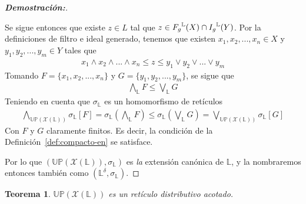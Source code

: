 \documentclass[12pt]{book}
\newtheorem{theorem}{Teorema}[section]
\newcommand{\Fg}{\mathnormal{F_g}}
\newcommand{\Ig}{\mathnormal{I_g}}
\newcommand{\Up}{\mathbb{UP}}
\begin{document}
\begin{proof}[\textbf{Demostración:}]
\begin{enumerate}
Se sigue entonces que existe  $z\in L$ tal que $z\in \Fg^{\mathbb{L}}(X)\cap \Ig^{\mathbb{L}}(Y)$. Por la definiciones de filtro e ideal generado, tenemos que existen $x_1,x_2,...,x_n\in X$ y $y_1,y_2,...,y_m\in Y$ tales que
\begin{align*}
    x_1\wedge x_2\wedge...\wedge x_n\leq z\leq y_1\vee y_2\vee...\vee y_m
\end{align*}
Tomando $F=\{x_1,x_2,...,x_n\}$ y $G=\{y_1,y_2,...,y_m\}$, se sigue que
\begin{align*}
    \bigwedge_\mathbb L{} F\leq \bigvee_{\mathbb L} G
\end{align*}
Teniendo en cuenta que $\sigma_{\mathbb{L}}$ es un homomorfismo de retículos
\begin{align*}
    \bigwedge_{\Up(\mathcal{X}(\mathbb L))} \sigma_{\mathbb{L}}[F]=\sigma_{\mathbb{L}}\left(\bigwedge_{\mathbb{L}} F\right)\leq \sigma_{\mathbb{L}}\left(\bigvee_{\mathbb{L}} G\right) =\bigvee_{\Up(\mathcal{X}(\mathbb L))} \sigma_{\mathbb{L}}[G]
\end{align*}
Con $F$ y $G$ claramente finitos. Es decir, la condición de la Definición~\ref{def:compacto-en} se satisface.
\end{enumerate}
Por lo que $\left(\Up(\mathcal{X}(\mathbb{L})),\sigma_{\mathbb{L}} \right)$ es \emph{la} extensión canónica de $\mathbb{L}$, y la nombraremos entonces también como $(\mathbb{L}^\delta, \sigma_{\mathbb{L}})$.
\end{proof}


\begin{theorem}\label{thm:Up-distribuida-acotada}
$\Up(\mathcal{X}(\mathbb{L}))$ es un retículo distributivo acotado.
\end{theorem}
\end{document}
